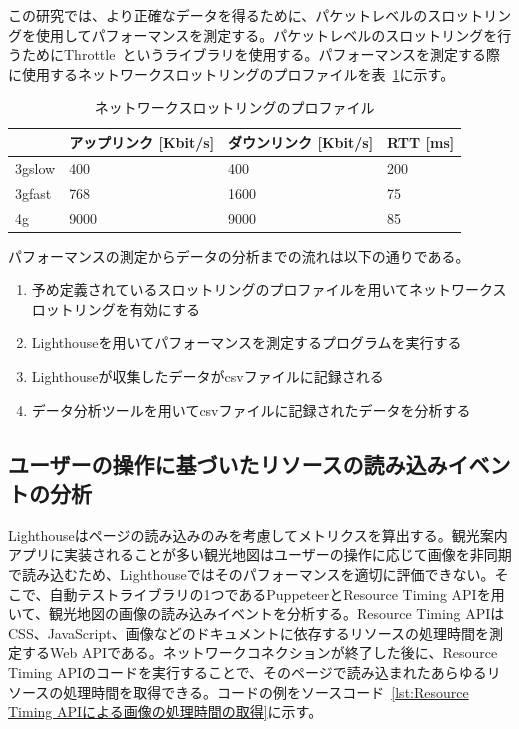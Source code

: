 この研究では、より正確なデータを得るために、パケットレベルのスロットリングを使用してパフォーマンスを測定する。パケットレベルのスロットリングを行うためにThrottle~\cite{Throttle}というライブラリを使用する。パフォーマンスを測定する際に使用するネットワークスロットリングのプロファイルを表~\ref{table:ネットワークスロットリングのプロファイル}に示す。
\begin{table}
  \caption{ネットワークスロットリングのプロファイル}
  \label{table:ネットワークスロットリングのプロファイル}
  \centering
  \begin{tabular}{|p{5em}|p{10em}|p{10em}|p{10em}|}
    \hline
    & アップリンク [Kbit/s] & ダウンリンク [Kbit/s] & RTT [ms] \\ \hline
    3gslow & 400 & 400 & 200 \\ \hline
    3gfast & 768 & 1600 & 75 \\ \hline
    4g & 9000 & 9000 & 85 \\ \hline
  \end{tabular}
\end{table}
パフォーマンスの測定からデータの分析までの流れは以下の通りである。
\begin{enumerate}
    \item 予め定義されているスロットリングのプロファイルを用いてネットワークスロットリングを有効にする
    \item Lighthouseを用いてパフォーマンスを測定するプログラムを実行する
    \item Lighthouseが収集したデータがcsvファイルに記録される
    \item データ分析ツールを用いてcsvファイルに記録されたデータを分析する
\end{enumerate}

\subsection{ユーザーの操作に基づいたリソースの読み込みイベントの分析}
\label{subsection:ユーザーの操作に基づいたリソースの読み込みイベントの分析}
Lighthouseはページの読み込みのみを考慮してメトリクスを算出する。観光案内アプリに実装されることが多い観光地図はユーザーの操作に応じて画像を非同期で読み込むため、Lighthouseではそのパフォーマンスを適切に評価できない。そこで、自動テストライブラリの1つであるPuppeteerとResource Timing APIを用いて、観光地図の画像の読み込みイベントを分析する。Resource Timing APIはCSS、JavaScript、画像などのドキュメントに依存するリソースの処理時間を測定するWeb APIである。ネットワークコネクションが終了した後に、Resource Timing APIのコードを実行することで、そのページで読み込まれたあらゆるリソースの処理時間を取得できる。コードの例をソースコード~\ref{lst:Resource Timing APIによる画像の処理時間の取得}に示す。

